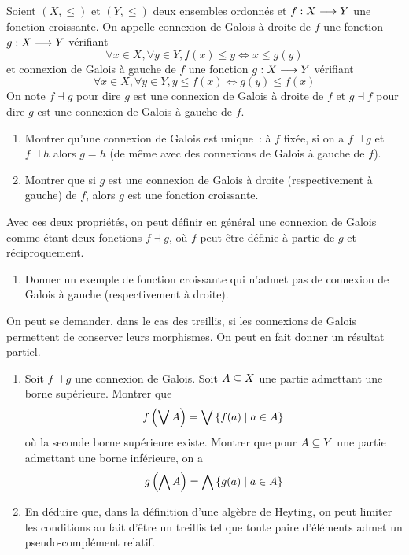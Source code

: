 \begin{exercise}\label{exo.galois.con}
  Soient $(X,\leq)$ et $(Y,\leq)$ deux ensembles ordonnés et
  $f : \displaystyle X \longrightarrow Y$ une fonction croissante. On appelle connexion
  de Galois à droite de $f$ une fonction $g : \displaystyle X \longrightarrow Y$ vérifiant
  \[\forall x \in X, \forall y \in Y, f(x) \leq y \iff x \leq g(y)\]
  et connexion de Galois à gauche de $f$ une fonction $g : \displaystyle X \longrightarrow Y$
  vérifiant
  \[\forall x \in X, \forall y \in Y, y \leq f(x) \iff g(y) \leq f(x)\]
  On note $f\dashv g$ pour dire \og $g$ est une connexion de Galois à droite de
  $f$\fg{} et $g\dashv f$ pour dire \og $g$ est une connexion de Galois à gauche
  de $f$\fg{}.
  \begin{enumerate}[label=(\roman*)]
  \item Montrer qu'une connexion de Galois est unique~: à $f$ fixée, si on a
    $f\dashv g$ et $f\dashv h$ alors $g = h$ (de même avec des connexions de
    Galois à gauche de $f$).
  \item Montrer que si $g$ est une connexion de Galois à droite (respectivement
    à gauche) de $f$, alors $g$ est une fonction croissante.
  \end{enumerate}
  Avec ces deux propriétés, on peut définir en général une connexion de Galois
  comme étant deux fonctions $f\dashv g$, où $f$ peut être définie à partie de
  $g$ et réciproquement.
  \begin{enumerate}[resume]
  \item Donner un exemple de fonction croissante qui n'admet pas de connexion
    de Galois à gauche (respectivement à droite).
  \end{enumerate}
  On peut se demander, dans le cas des treillis, si les connexions de Galois
  permettent de conserver leurs morphismes. On peut en fait donner un résultat
  partiel.
  \begin{enumerate}[resume]
  \item Soit $f\dashv g$ une connexion de Galois. Soit $A\subseteq X$ une
    partie admettant une borne supérieure. Montrer que
    \[f\left(\bigvee A\right) = \bigvee \left\{ f(a) \;\middle\vert\; a\in A \right\}\]
    où la seconde borne supérieure existe. Montrer que pour $A\subseteq Y$
    une partie admettant une borne inférieure, on a
    \[g\left(\bigwedge A\right) = \bigwedge \left\{ g(a) \;\middle\vert\; a\in A \right\}\]
  \item En déduire que, dans la définition d'une algèbre de Heyting, on peut
    limiter les conditions au fait d'être un treillis tel que toute paire
    d'éléments admet un pseudo-complément relatif.

\end{enumerate}
\end{exercise}
